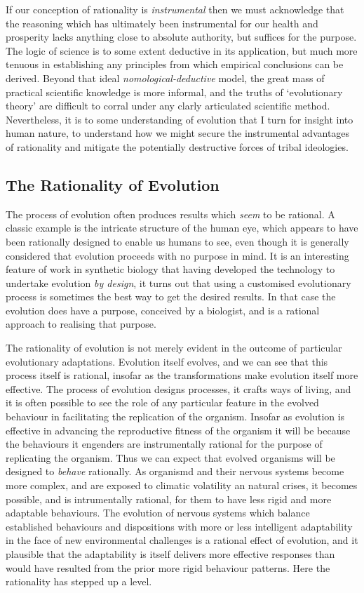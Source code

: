 \documentclass[10pt,titlepage]{article}
\begin{document}
If our conception of rationality is \emph{instrumental} then we must acknowledge that the reasoning which has ultimately been instrumental for our health and prosperity lacks anything close to absolute authority, but suffices for the purpose.
The logic of science is to some extent deductive in its application, but much more tenuous in establishing any principles from which empirical conclusions can be derived.
Beyond that ideal \emph{nomological-deductive} model, the great mass of practical scientific knowledge is more informal, and the truths of `evolutionary theory' are difficult to corral under any clarly articulated scientific method.
Nevertheless, it is to some understanding of evolution that I turn for insight into human nature, to understand how we might secure the instrumental advantages of rationality and mitigate the potentially destructive forces of tribal ideologies.

\subsection{The Rationality of Evolution}

The process of evolution often produces results which \emph{seem} to be rational.
A classic example is the intricate structure of the human eye, which appears to have been rationally designed to enable us humans to see, even though it is generally considered that evolution proceeds with no purpose in mind.
It is an interesting feature of work in synthetic biology that having developed the technology to undertake evolution \emph{by design}, it turns out that using a customised evolutionary process is sometimes the best way to get the desired results.
In that case the evolution does have a purpose, conceived by a biologist, and is a rational approach to realising that purpose.

The rationality of evolution is not merely evident in the outcome of particular evolutionary adaptations.
Evolution itself evolves, and we can see that this process itself is rational, insofar as the transformations make evolution itself more effective.
The process of evolution designs processes, it crafts ways of living, and it is often possible to see the role of any particular feature in the evolved behaviour in facilitating the replication of the organism.
Insofar as evolution is effective in advancing the reproductive fitness of the organism it will be because the behaviours it engenders are instrumentally rational for the purpose of replicating the organism.
Thus we can expect that evolved organisms will be designed to \emph{behave} rationally.
As organismd and their nervous systems become more complex, and are exposed to climatic volatility an natural crises, it becomes possible, and is intrumentally rational, for them to have less rigid and more adaptable behaviours.
The evolution of nervous systems which balance established behaviours and dispositions with more or less intelligent adaptability in the face of new environmental challenges is a rational effect of evolution, and it plausible that the adaptability is itself delivers more effective responses than would have resulted from the prior more rigid behaviour patterns.
Here the rationality has stepped up a level.
\end{document}

